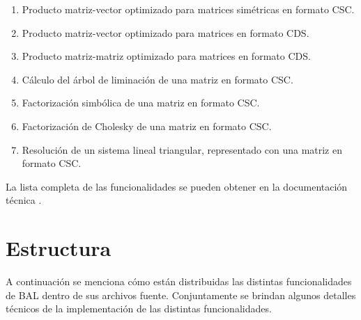 \documentclass[a4paper,10pt]{article}
\begin{document}
\begin{enumerate}
\begin{enumerate}
  \item Producto matriz-vector optimizado para matrices simétricas en formato CSC.
  \item Producto matriz-vector optimizado para matrices en formato CDS.
  \item Producto matriz-matriz optimizado para matrices en formato CDS.
  \item Cálculo del árbol de liminación de una matriz en formato CSC.
  \item Factorización simbólica de una matriz en formato CSC.
  \item Factorización de Cholesky de una matriz en formato CSC.
  \item Resolución de un sistema lineal triangular, representado con una matriz en formato CSC.
 \end{enumerate}
\end{enumerate}
La lista completa de las funcionalidades se pueden obtener en la documentación técnica \cite{bal_tecnica}.

\section{Estructura}
\label{sec_estructura}
A continuación se menciona cómo están distribuidas las distintas funcionalidades de BAL dentro de sus archivos fuente. Conjuntamente se brindan algunos detalles técnicos de la implementación de las distintas funcionalidades.
\end{document}
